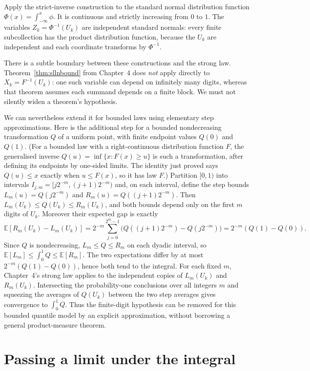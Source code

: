 Apply the strict-inverse construction to the standard normal distribution function $\Phi(x)=\int_{-\infty}^x\phi$. It is continuous and strictly increasing from $0$ to $1$. The variables $Z_k=\Phi^{-1}(U_k)$ are independent standard normals: every finite subcollection has the product distribution function, because the $U_k$ are independent and each coordinate transforms by $\Phi^{-1}$.

There is a subtle boundary between these constructions and the strong law. Theorem~\ref{thm:sllnbound} from Chapter~4 does \emph{not} apply directly to $X_k=F^{-1}(U_k)$: one such variable can depend on infinitely many digits, whereas that theorem assumes each summand depends on a finite block. We must not silently widen a theorem's hypothesis.

We can nevertheless extend it for bounded laws using elementary step approximations. Here is the additional step for a bounded nondecreasing transformation $Q$ of a uniform point, with finite endpoint values $Q(0)$ and $Q(1)$. (For a bounded law with a right-continuous distribution function $F$, the generalised inverse $Q(u)=\inf\{x:F(x)\ge u\}$ is such a transformation, after defining its endpoints by one-sided limits. The identity just proved says $Q(u)\le x$ exactly when $u\le F(x)$, so it has law $F$.) Partition $[0,1)$ into intervals $I_{j,m}=[j2^{-m},(j+1)2^{-m})$ and, on each interval, define the step bounds $L_m(u)=Q(j2^{-m})$ and $R_m(u)=Q((j+1)2^{-m})$. Then $L_m(U_k)\le Q(U_k)\le R_m(U_k)$, and both bounds depend only on the first $m$ digits of $U_k$. Moreover their expected gap is exactly
\[
\mathbb E[R_m(U_k)-L_m(U_k)]=2^{-m}\sum_{j=0}^{2^m-1}\bigl(Q((j+1)2^{-m})-Q(j2^{-m})\bigr)=2^{-m}(Q(1)-Q(0)).
\]
Since $Q$ is nondecreasing, $L_m\le Q\le R_m$ on each dyadic interval, so $\mathbb E[L_m]\le\int_0^1 Q\le\mathbb E[R_m]$. The two expectations differ by at most $2^{-m}(Q(1)-Q(0))$, hence both tend to the integral. For each fixed $m$, Chapter~4's strong law applies to the independent copies of $L_m(U_k)$ and $R_m(U_k)$. Intersecting the probability-one conclusions over all integers $m$ and squeezing the averages of $Q(U_k)$ between the two step averages gives convergence to $\int_0^1 Q$. Thus the finite-digit hypothesis can be removed for this bounded quantile model by an explicit approximation, without borrowing a general product-measure theorem.

\section{Passing a limit under the integral}

